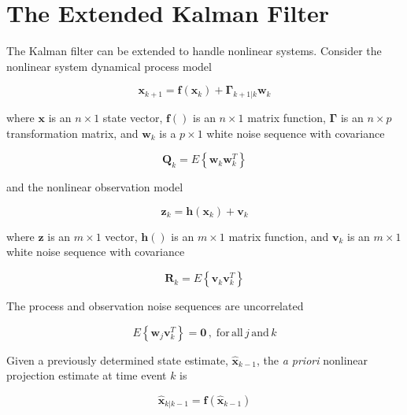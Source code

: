 \section{The Extended Kalman Filter}
\label{The Extended Kalman Filter}

The Kalman filter can be extended to handle nonlinear systems. Consider the nonlinear system dynamical process model

\begin{equation*}
    \mathbf{x}_{k+1} = \mathbf{f} \left( \mathbf{x}_k \right) + \mathbf{\Gamma}_{k+1|k} \mathbf{w}_k
\end{equation*}

where $\mathbf{x}$ is an $n \times 1$ state vector, $\mathbf{f}()$ is an $n \times 1$
matrix function, $\mathbf{\Gamma}$ is an $n \times p$ transformation matrix, and $\mathbf{w}_k$
is a $p \times 1$ white noise sequence with covariance

\begin{equation*}
    \mathbf{Q}_k = E \left\{ \mathbf{w}_k \mathbf{w}_k^T \right\}
\end{equation*}

and the nonlinear observation model

\begin{equation*}
    \mathbf{z}_k = \mathbf{h} \left( \mathbf{x}_k \right) + \mathbf{v}_k
\end{equation*}

where $\mathbf{z}$ is an $m \times 1$ vector, $\mathbf{h}()$ is an $m \times 1$ matrix
function, and $\mathbf{v}_k$ is an $m \times 1$ white noise sequence with covariance

\begin{equation*}
    \mathbf{R}_k = E \left\{ \mathbf{v}_k \mathbf{v}_k^T \right\}
\end{equation*}

The process and observation noise sequences are uncorrelated

\begin{equation*}
    E \left\{ \mathbf{w}_j \mathbf{v}_k^T \right\} = \mathbf{0} \, , \phantom{.} \mathrm{for} \, \mathrm{all} \, j \, \mathrm{and} \, k
\end{equation*}

Given a previously determined state estimate, $\hat{\mathbf{x}}_{k-1}$, the \textit{a priori}
nonlinear projection estimate at time event $k$ is

\begin{equation*}
    \hat{\mathbf{x}}_{k|k-1} = \mathbf{f} \left( \hat{\mathbf{x}}_{k-1} \right)
\end{equation*}

